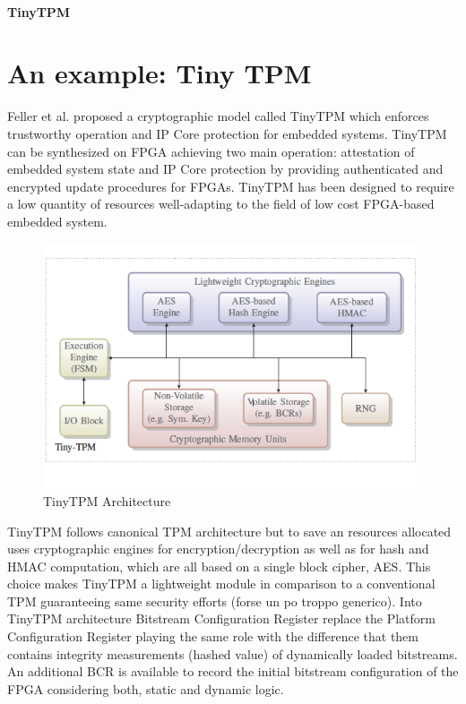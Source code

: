 \documentclass[../tesi.tex]{subfiles}
\begin{document}
{\paragraph{TinyTPM}
\section{An example: Tiny TPM}
Feller et al. proposed a cryptographic model called TinyTPM which enforces trustworthy operation and IP Core protection for embedded systems. TinyTPM can be synthesized on FPGA achieving two main operation: attestation of embedded system state and IP Core protection by providing authenticated and encrypted update procedures for FPGAs. TinyTPM has been designed to require a low quantity of resources well-adapting to the field of low cost FPGA-based embedded system. 
\begin{figure}
\centering
\includegraphics[scale=0.50]{images/tinyTPM.png}
\caption{TinyTPM Architecture}
\label{nome}
\end{figure} 
TinyTPM follows canonical TPM architecture but to save an resources allocated uses cryptographic engines for encryption/decryption as well as for hash and HMAC computation, which are all based on a single block cipher, AES. This choice makes TinyTPM a lightweight module in comparison to a conventional TPM guaranteeing same security efforts (forse un po troppo generico). Into TinyTPM architecture Bitstream Configuration Register replace the Platform Configuration Register playing the same role with the difference that them contains integrity measurements (hashed value) of dynamically loaded bitstreams. An additional BCR is available to record the initial bitstream configuration of the FPGA considering both, static and dynamic logic. \\
}
\end{document}
